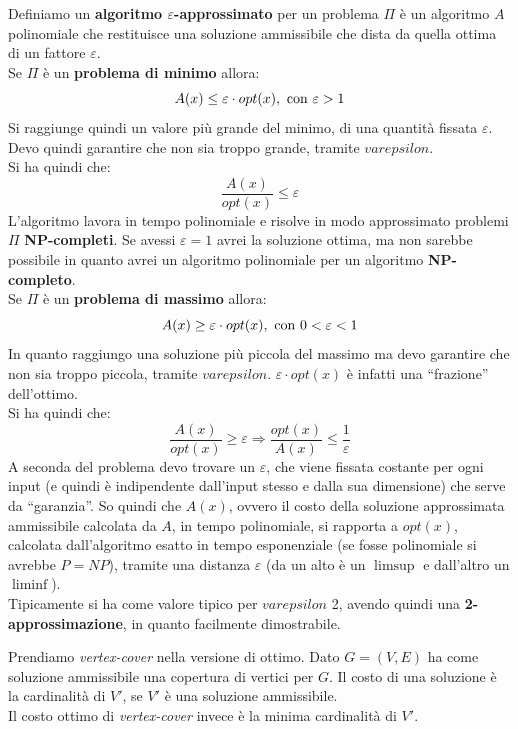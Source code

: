 \documentclass[a4paper,12pt, oneside]{book}
\begin{document}
\begin{definizione}
  Definiamo un \textbf{algoritmo $\varepsilon$-approssimato} per un problema
  $\Pi$ è un 
  algoritmo $A$ polinomiale che restituisce una soluzione ammissibile che dista
  da quella ottima di un fattore $\varepsilon$.\\
  Se $\Pi$ è un \textbf{problema di minimo} allora:
  \[A(x)\leq \varepsilon\cdot opt(x), \mbox{ \textnormal{con} }\varepsilon>1\]
  Si raggiunge quindi un valore più grande del minimo, di una quantità fissata
  $\varepsilon$. Devo quindi garantire che non sia troppo grande, tramite
  $varepsilon$.\\
  Si ha quindi che:
  \[\frac{A(x)}{opt(x)}\leq \varepsilon\]
  L'algoritmo lavora in tempo polinomiale e risolve in modo approssimato
  problemi $\Pi$ \textbf{NP-completi}. Se avessi $\varepsilon=1$ avrei la
  soluzione ottima, ma non sarebbe possibile in quanto avrei un algoritmo
  polinomiale per un algoritmo \textbf{NP-completo}.\\
  Se $\Pi$ è un \textbf{problema di massimo} allora:
  \[A(x)\geq \varepsilon\cdot opt(x), \mbox{ \textnormal{con} }0<\varepsilon<1\]
  In quanto raggiungo una soluzione più piccola del massimo ma devo garantire
  che non sia troppo piccola, tramite $varepsilon$. $\varepsilon\cdot opt(x)$ è
  infatti una ``frazione'' dell'ottimo.\\
  Si ha quindi che:
  \[\frac{A(x)}{opt(x)}\geq \varepsilon\Longrightarrow\frac{opt(x)}{A(x)}\leq
    \frac{1}{\varepsilon}\]
  A seconda del problema devo trovare un $\varepsilon$, che viene fissata
  costante per ogni input (e quindi è indipendente dall'input stesso e dalla sua
  dimensione) che serve da ``garanzia''. So quindi che $A(x)$, ovvero il costo
  della soluzione approssimata ammissibile calcolata da $A$, in tempo
  polinomiale, si rapporta a $opt(x)$, calcolata dall'algoritmo esatto in tempo
  esponenziale (se fosse polinomiale si avrebbe $P=NP$), tramite una distanza
  $\varepsilon$ (da un alto è un $\limsup$ e dall'altro un $\liminf$).\\
  Tipicamente si ha come valore tipico per $varepsilon$ 2, avendo quindi
  una \textbf{2-approssimazione}, in quanto facilmente dimostrabile.
\end{definizione}
\begin{esempio}
  Prendiamo \textit{vertex-cover} nella versione di ottimo. Dato $G=(V,E)$ ha
  come soluzione ammissibile una copertura di vertici per $G$. Il costo di una
  soluzione è la cardinalità di $V'$, se $V'$ è una soluzione ammissibile.\\
  Il costo ottimo di \textit{vertex-cover} invece è la minima cardinalità di
  $V'$.
\end{esempio}
\end{document}
